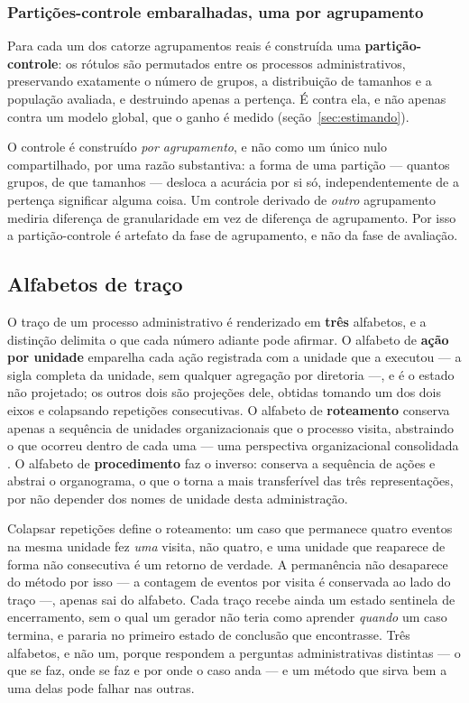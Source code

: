 \subsubsection{Partições-controle embaralhadas, uma por agrupamento}\label{sec:controles}

Para cada um dos catorze agrupamentos reais é construída uma \textbf{partição-controle}: os rótulos
são permutados entre os processos administrativos, preservando exatamente o número de grupos, a
distribuição de tamanhos e a população avaliada, e destruindo apenas a pertença. É contra ela, e não
apenas contra um modelo global, que o ganho é medido (seção~\ref{sec:estimando}).

O controle é construído \emph{por agrupamento}, e não como um único nulo compartilhado, por uma
razão substantiva: a forma de uma partição --- quantos grupos, de que tamanhos --- desloca a
acurácia por si só, independentemente de a pertença significar alguma coisa. Um controle derivado de
\emph{outro} agrupamento mediria diferença de granularidade em vez de diferença de agrupamento. Por
isso a partição-controle é artefato da fase de agrupamento, e não da fase de avaliação.

\subsection{Alfabetos de traço}\label{sec:alfabetos}

O traço de um processo administrativo é renderizado em \textbf{três} alfabetos, e a distinção
delimita o que cada número adiante pode afirmar. O alfabeto de \textbf{ação por unidade} emparelha
cada ação registrada com a unidade que a executou --- a sigla completa da unidade, sem qualquer
agregação por diretoria ---, e é o estado não projetado; os outros dois são projeções dele, obtidas
tomando um dos dois eixos e colapsando repetições consecutivas. O alfabeto de \textbf{roteamento}
conserva apenas
a sequência de unidades organizacionais que o processo visita, abstraindo o que ocorreu dentro de
cada uma --- uma perspectiva organizacional consolidada \cite{song2008organizational}. O alfabeto
de \textbf{procedimento} faz o inverso: conserva a sequência de ações e abstrai o organograma, o que
o torna a mais transferível das três representações, por não depender dos nomes de unidade desta
administração.

Colapsar repetições define o roteamento: um caso que permanece
quatro eventos na mesma unidade fez \emph{uma} visita, não quatro, e uma unidade que reaparece de
forma não consecutiva é um retorno de verdade. A permanência não desaparece do método por isso ---
a contagem de eventos por visita é conservada ao lado do traço ---, apenas sai do alfabeto. Cada
traço recebe ainda um estado sentinela de encerramento, sem o qual um gerador não teria como
aprender \emph{quando} um caso termina, e pararia no primeiro estado de conclusão que encontrasse.
Três alfabetos, e não um, porque respondem a perguntas administrativas distintas --- o que se faz,
onde se faz e por onde o caso anda --- e um método que sirva bem a uma delas pode falhar nas
outras.


